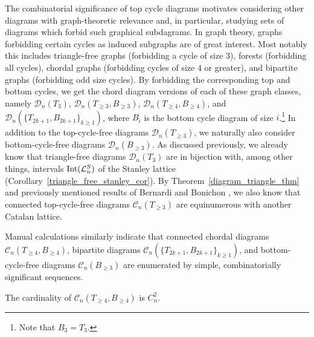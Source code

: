 The combinatorial significance of top cycle diagrams motivates considering other diagrams with graph-theoretic relevance and, in particular, studying sets of diagrams which forbid such graphical subdagrams. In graph theory, graphs forbidding certain cycles as induced subgraphs are of great interest. Most notably this includes triangle-free graphs (forbidding a cycle of size 3), forests (forbidding all cycles), chordal graphs (forbidding cycles of size $4$ or greater), and bipartite graphs (forbidding odd size cycles). By forbidding the corresponding top and bottom cycles, we get the chord diagram versions of each of these graph classes, namely $\mathcal{D}_{n}(T_{3})$, $\mathcal{D}_{n}(T_{\geqslant 3},B_{\geqslant 3})$, $\mathcal{D}_{n}(T_{\geqslant 4},B_{\geqslant 4})$, and $\mathcal{D}_{n}(\{T_{2k+1},B_{2k+1}\}_{k \geqslant 1})$, where $B_{i}$ is the bottom cycle diagram of size $i$.\footnote{Note that $B_{3} = T_{3}$.} In addition to the top-cycle-free diagrams $\mathcal{D}_{n}(T_{\geqslant 3})$, we naturally also consider bottom-cycle-free diagrams $\mathcal{D}_{n}(B_{\geqslant 3})$. As discussed previously, we already know that triangle-free diagrams $\mathcal{D}_{n}(T_{3})$ are in bijection with, among other things, intervals $\textnormal{Int}(\mathcal{L}^{S}_{n})$ of the Stanley lattice (Corollary~\ref{triangle_free_stanley_cor}). By Theorem~\ref{diagram_triangle_thm} and previously mentioned results of Bernardi and Bonichon \cite{Bernardi2009}, we also know that connected top-cycle-free diagrams $\mathcal{C}_{n}(T_{\geqslant 3})$ are equinumerous with another Catalan lattice. 

Manual calculations similarly indicate that connected chordal diagrams $\mathcal{C}_{n}(T_{\geqslant 4}, B_{\geqslant 4})$, bipartite diagrams $\mathcal{C}_{n}(\{T_{2k+1}, B_{2k+1}\}_{k \geqslant 1})$, and bottom-cycle-free diagrams $\mathcal{C}_{n}(B_{\geqslant 3})$ are enumerated by simple, combinatorially significant sequences. 

\begin{conjecture}
The cardinality of $\mathcal{C}_{n}(T_{\geqslant 4}, B_{\geqslant 4})$ is $C_{n}^{2}$. 
\end{conjecture}
